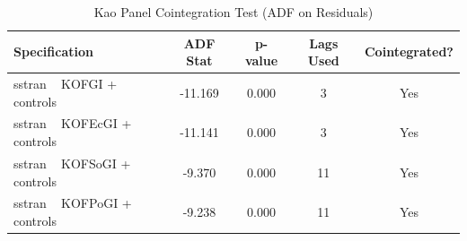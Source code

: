\begin{table}
\caption{Kao Panel Cointegration Test (ADF on Residuals)}
\label{tab:cointegration}
\begin{tabular}{lcccc}
\toprule
Specification & ADF Stat & p-value & Lags Used & Cointegrated? \\
\midrule
sstran ~ KOFGI + controls & -11.169 & 0.000 & 3 & Yes \\
sstran ~ KOFEcGI + controls & -11.141 & 0.000 & 3 & Yes \\
sstran ~ KOFSoGI + controls & -9.370 & 0.000 & 11 & Yes \\
sstran ~ KOFPoGI + controls & -9.238 & 0.000 & 11 & Yes \\
\bottomrule
\end{tabular}
\end{table}
